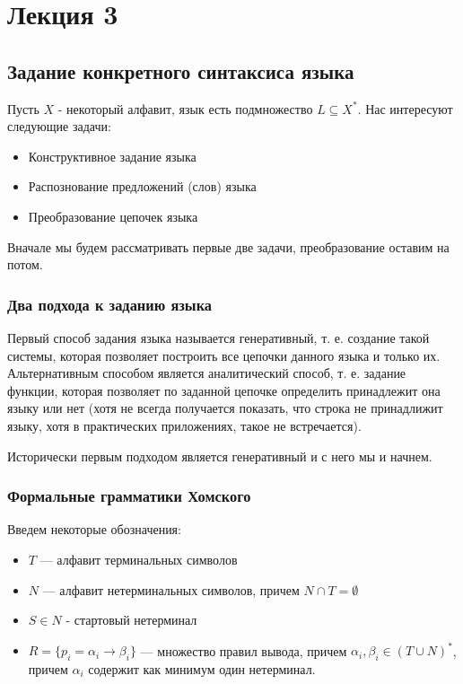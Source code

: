 \chapter{Лекция 3}

\section{Задание конкретного синтаксиса языка}

Пусть $X$ - некоторый алфавит, язык есть подмножество $L \subseteq X^{*}$. Нас интересуют следующие задачи:

\begin{itemize}
\item Конструктивное задание языка

\item Распознование предложений (слов) языка

\item Преобразование цепочек языка
\end{itemize}

Вначале мы будем рассматривать первые две задачи, преобразование оставим на потом.

\subsection{Два подхода к заданию языка}

Первый способ задания языка называется генеративный, т. е. создание такой системы, которая позволяет построить все цепочки данного языка и только их.
Альтернативным способом является аналитический способ, т. е. задание функции, которая позволяет по заданной цепочке определить принадлежит она языку или нет (хотя
не всегда получается показать, что строка не принадлижит языку, хотя в практических приложениях, такое не встречается).

Исторически первым подходом является генеративный и с него мы и начнем.

\subsection{Формальные грамматики Хомского}

Введем некоторые обозначения:

\begin{itemize}
\item $T$ --- алфавит терминальных символов

\item $N$ --- алфавит нетерминальных символов, причем $N \cap T = \emptyset$

\item $S \in N$ - стартовый нетерминал

\item $R = \{p_i = \alpha_i \rightarrow \beta_i\}$ --- множество правил вывода, причем $\alpha_i,\beta_i \in \left(T\cup N\right)^{*}$, причем $\alpha_i$ содержит как минимум один
нетерминал.
\end{itemize}


